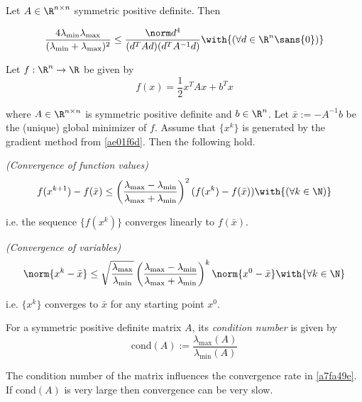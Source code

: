 \label{eb4e630}

Let $A\in\R^{n\times n}$ symmetric positive definite. Then

\begin{equation*}
  \def\l{\lambda_{\min}}\def\L{\lambda_{\max}}
  \frac{4\l\L}{(\l+\L)^2}\leq\frac{\norm d^4}{(d^TAd)(d^TA^{-1}d)}
  \with{(\forall d\in\R^n\sans{0})}
\end{equation*}

\label{a7fa49e}

Let $f:\R^n\to\R$ be given by
$$
  f(x)=\frac12x^TAx+b^Tx
$$

where $A\in\R^{n\times n}$ is symmetric positive definite and $b\in\R^n$. Let
$\bar x:=-A^{-1}b$ be the (unique) global minimizer of $f$. Assume that
$\{x^k\}$ is generated by the gradient method from \autoref{ae01f6d}. Then the
following hold.
\begin{enumerata}
  \item \textit{(Convergence of function values)}
  \begin{equation*}
    \def\l{\lambda_{\min}}\def\L{\lambda_{\max}}
    f(x^{k+1})-f(\bar x)\leq\left(\frac{\L-\l}{\L+\l}\right)^2(f(x^k)-f(\bar x))\with{(\forall k\in\N)}
  \end{equation*}

  i.e. the sequence $\{f(x^k)\}$ converges linearly to $f(\bar x)$.
  \item \textit{(Convergence of variables)}
  \begin{equation*}
    \def\l{\lambda_{\min}}\def\L{\lambda_{\max}}
    \norm{x^k-\bar x}\leq
    \sqrt{\frac\L\l}
    \left(\frac{\L-\l}{\L+\l}\right)^k\norm{x^0-\bar x}\with{\forall k\in\N}
  \end{equation*}

  i.e. $\{x^k\}$ converges to $\bar x$ for any starting point $x^0$.
\end{enumerata}

\label{bde2dc3}

For a symmetric positive definite matrix $A$, its \textit{condition number} is
given by
$$
  \text{cond}(A):=\frac{\lambda_{\max}(A)}{\lambda_{\min}(A)}
$$

The condition number of the matrix influences the convergence rate in
\autoref{a7fa49e}. If $\text{cond}(A)$ is very large then convergence can be
very slow.

\label{b401f98}

